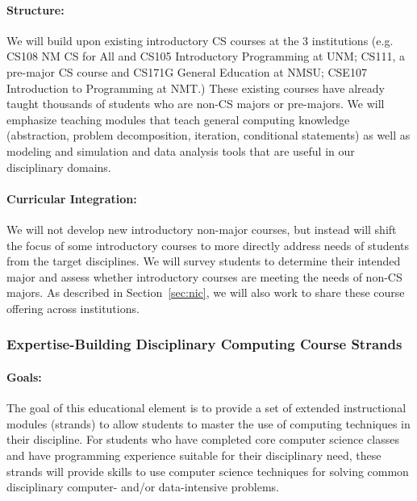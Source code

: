 \paragraph{Structure:} We will build upon existing introductory CS courses at the 3 institutions (e.g. CS108 NM CS for All and CS105 Introductory Programming at UNM; CS111, a pre-major CS course and CS171G General Education at NMSU; CSE107 Introduction to Programming at NMT.) These existing courses have already taught thousands of students who are non-CS majors or pre-majors. We will emphasize teaching modules that teach general computing knowledge (abstraction, problem decomposition, iteration, conditional statements) as well as modeling and simulation and data analysis tools that are useful in our disciplinary domains.

\paragraph{Curricular Integration:}
We will not develop new introductory non-major courses, but instead will shift the focus of some introductory courses to more directly address needs of students from the target disciplines. We will survey students to determine their intended major and assess whether introductory courses are meeting the needs of non-CS majors. As described in Section~\ref{sec:nic}, we will also work to share these course offering across institutions.

\subsubsection{Expertise-Building Disciplinary Computing Course Strands}
\paragraph{Goals:} The goal of this educational element is to provide a set of extended instructional modules (strands) to allow students to master the use of computing techniques in their discipline. For students who have completed core computer science classes and have programming experience suitable for their disciplinary need, these strands will provide skills to use computer science techniques for solving common disciplinary computer- and/or data-intensive problems. 

